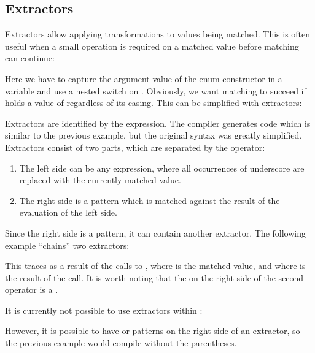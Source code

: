 \subsection{Extractors}
\label{lf-pattern-matching-extractors}

Extractors allow applying transformations to values being matched. This is often useful when a small operation is required on a matched value before matching can continue:


Here we have to capture the argument value of the  enum constructor in a variable  and use a nested switch on . Obviously, we want matching to succeed if  holds a value of  regardless of its casing. This can be simplified with extractors:


Extractors are identified by the  expression. The compiler generates code which is similar to the previous example, but the original syntax was greatly simplified. Extractors consist of two parts, which are separated by the \expr{=>} operator:

\begin{enumerate}
\item The left side can be any expression, where all occurrences of underscore \expr{_} are replaced with the currently matched value.
\item The right side is a pattern which is matched against the result of the evaluation of the left side.
\end{enumerate}

Since the right side is a pattern, it can contain another extractor. The following example ``chains'' two extractors:


This traces  as a result of the calls to , where  is the matched value, and  where  is the result of the  call. It is worth noting that the  on the right side of the second \expr{=>} operator is a .

It is currently not possible to use extractors within :


However, it is possible to have or-patterns on the right side of an extractor, so the previous example would compile without the parentheses.


